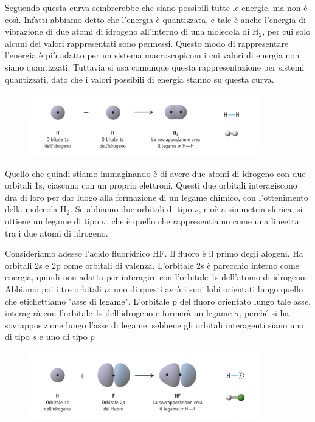\vspace{0.2cm}
Seguendo questa curva sembrerebbe che siano possibili tutte le energie, ma non è così. Infatti abbiamo detto che l'energia è quantizzata, e tale è anche l'energia di vibrazione di due atomi di idrogeno all'interno di una molecola di H$_2$, per cui solo alcuni dei valori rappresentati sono permessi. Questo modo di rappresentare l'energia è più adatto per un sistema macroscopicom i cui valori di energia non siano quantizzati. Tuttavia si usa comunque questa rappresentazione per sistemi quantizzati, dato che i valori possibili di energia stanno su questa curva.
\begin{figure}[htp]
    \centering
    \includegraphics[width=10cm]{immagini/legame-H_2.png}
\end{figure}

Quello che quindi stiamo immaginando è di avere due atomi di idrogeno con due orbitali 1s, ciascuno con un proprio elettroni. Questi due orbitali interagiscono dra di loro per dar luogo alla formazione di un legame chimico, con l'ottenimento della molecola H$_2$. Se abbiamo due orbitali di tipo $s$, cioè a simmetria sferica, si ottiene un legame di tipo $\sigma$, che è quello che rappresentiamo come una lineetta tra i due atomi di idrogeno. 

\vspace{0.2cm}Consideriamo adesso l'acido fluoridrico HF. Il fluoro è il primo degli alogeni. Ha orbitali 2s e 2p come orbitali di valenza. L'orbitale 2s è parecchio interno come energia, quindi non adatto per interagire con l'orbitale 1s dell'atomo di idrogeno. Abbiamo poi i tre orbitali $p$: uno di questi avrà i suoi lobi orientati lungo quello che etichettiamo "asse di legame". L'orbitale p del fluoro orientato lungo tale asse, interagirà con l'orbitale 1s dell'idrogeno e formerà un legame $\sigma$, perché si ha sovrapposizione lungo l'asse di legame, sebbene gli orbitali interagenti siano uno di tipo $s$ e uno di tipo $p$
\begin{figure}[htp]
    \centering
    \includegraphics[width=10cm]{immagini/legame_H-F.png}
\end{figure}

